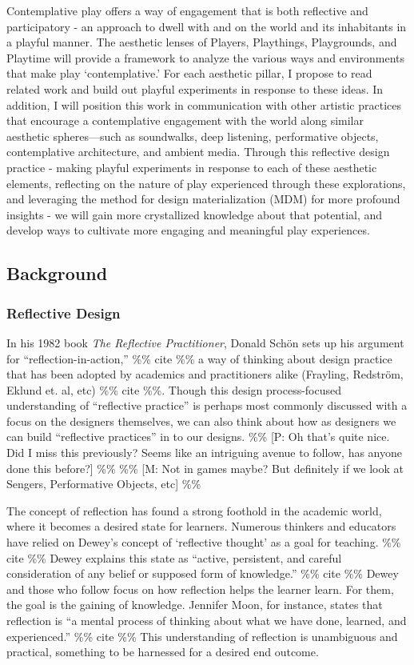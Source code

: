 \documentclass[
]{article}
\begin{document}
Contemplative play offers a way of engagement that is both reflective
and participatory - an approach to dwell with and on the world and its
inhabitants in a playful manner. The aesthetic lenses of Players,
Playthings, Playgrounds, and Playtime will provide a framework to
analyze the various ways and environments that make play
`contemplative.' For each aesthetic pillar, I propose to read related
work and build out playful experiments in response to these ideas. In
addition, I will position this work in communication with other artistic
practices that encourage a contemplative engagement with the world along
similar aesthetic spheres---such as soundwalks, deep listening,
performative objects, contemplative architecture, and ambient media.
Through this reflective design practice - making playful experiments in
response to each of these aesthetic elements, reflecting on the nature
of play experienced through these explorations, and leveraging the
method for design materialization (MDM) for more profound insights - we
will gain more crystallized knowledge about that potential, and develop
ways to cultivate more engaging and meaningful play experiences.

\subsection{Background}\label{background}

\subsubsection{Reflective Design}\label{reflective-design}

In his 1982 book \emph{The Reflective Practitioner}, Donald Schön sets
up his argument for ``reflection-in-action,'' \%\% cite \%\% a way of
thinking about design practice that has been adopted by academics and
practitioners alike (Frayling, Redström, Eklund et. al, etc) \%\% cite
\%\%. Though this design process-focused understanding of ``reflective
practice'' is perhaps most commonly discussed with a focus on the
designers themselves, we can also think about how as designers we can
build ``reflective practices'' in to our designs. \%\% {[}P: Oh that's
quite nice. Did I miss this previously? Seems like an intriguing avenue
to follow, has anyone done this before?{]} \%\% \%\% {[}M: Not in games
maybe? But definitely if we look at Sengers, Performative Objects,
etc{]} \%\%

The concept of reflection has found a strong foothold in the academic
world, where it becomes a desired state for learners. Numerous thinkers
and educators have relied on Dewey's concept of `reflective thought' as
a goal for teaching. \%\% cite \%\% Dewey explains this state as
``active, persistent, and careful consideration of any belief or
supposed form of knowledge.'' \%\% cite \%\% Dewey and those who follow
focus on how reflection helps the learner learn. For them, the goal is
the gaining of knowledge. Jennifer Moon, for instance, states that
reflection is ``a mental process of thinking about what we have done,
learned, and experienced.'' \%\% cite \%\% This understanding of
reflection is unambiguous and practical, something to be harnessed for a
desired end outcome.
\end{document}
